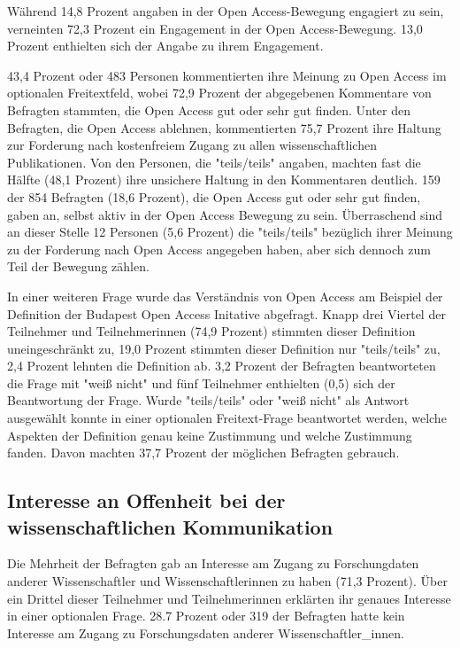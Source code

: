 Während 14,8 Prozent angaben in der Open Access-Bewegung engagiert zu sein, verneinten 72,3 Prozent ein Engagement in der Open Access-Bewegung. 13,0 Prozent enthielten sich der Angabe zu ihrem Engagement.

43,4 Prozent oder 483 Personen kommentierten ihre Meinung zu Open Access im optionalen Freitextfeld, wobei 72,9 Prozent der abgegebenen Kommentare von Befragten stammten, die Open Access gut oder sehr gut finden. Unter den Befragten, die Open Access ablehnen, kommentierten 75,7 Prozent ihre Haltung zur Forderung nach kostenfreiem Zugang zu allen wissenschaftlichen Publikationen. Von den Personen, die "teils/teils" angaben, machten fast die Hälfte (48,1 Prozent) ihre unsichere Haltung in den Kommentaren deutlich. 159 der 854 Befragten (18,6 Prozent), die Open Access gut oder sehr gut finden, gaben an, selbst aktiv in der Open Access Bewegung zu sein. Überraschend sind an dieser Stelle 12 Personen (5,6 Prozent) die "teils/teils" bezüglich ihrer Meinung zu der Forderung nach Open Access angegeben haben, aber sich dennoch zum Teil der Bewegung zählen.

In einer weiteren Frage wurde das Verständnis von Open Access am Beispiel der Definition der Budapest Open Access Initative \cite{boai_2012} abgefragt. Knapp drei Viertel der Teilnehmer und Teilnehmerinnen (74,9 Prozent) stimmten dieser Definition uneingeschränkt zu, 19,0 Prozent stimmten dieser Definition nur "teils/teils" zu, 2,4 Prozent lehnten die Definition ab. 3,2 Prozent der Befragten beantworteten die Frage mit "weiß nicht" und fünf Teilnehmer enthielten (0,5) sich der Beantwortung der Frage. Wurde "teils/teils" oder "weiß nicht" als Antwort ausgewählt konnte in einer optionalen Freitext-Frage beantwortet werden, welche Aspekten der Definition genau keine Zustimmung und welche Zustimmung fanden. Davon machten 37,7 Prozent der möglichen Befragten gebrauch.

\subsection{Interesse an Offenheit bei der wissenschaftlichen Kommunikation}

Die Mehrheit der Befragten gab an Interesse am Zugang zu Forschungdaten anderer Wissenschaftler und Wissenschaftlerinnen zu haben (71,3 Prozent). Über ein Drittel dieser Teilnehmer und Teilnehmerinnen erklärten ihr genaues Interesse in einer optionalen Frage. 28.7 Prozent oder 319 der Befragten hatte kein Interesse am Zugang zu Forschungsdaten anderer Wissenschaftler_innen.

